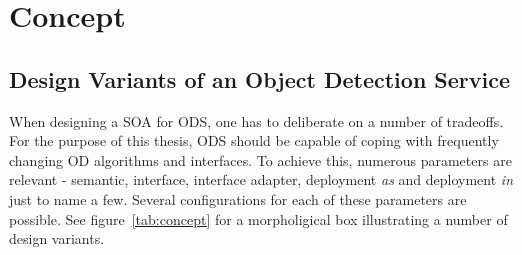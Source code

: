 \chapter{Concept\label{cha:chapter4}}
\section{Design Variants of an Object Detection Service}
\label{sec:concecptOverview}
When designing a SOA for ODS, one has to deliberate on a number of tradeoffs. For the purpose of this thesis, ODS should be capable of coping with frequently changing OD algorithms and interfaces. To achieve this, numerous parameters are relevant - semantic, interface, interface adapter, deployment \textit{as} and deployment \textit{in} just to name a few. Several configurations for each of these parameters are possible. See figure~\ref{tab:concept} for a morpholigical box illustrating a number of design variants.

